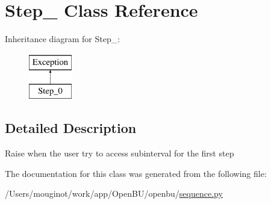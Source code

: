 \hypertarget{classopenbu_1_1sequence_1_1_step__0}{}\section{Step\+\_ Class Reference}
\label{classopenbu_1_1sequence_1_1_step__0}
Inheritance diagram for Step\+\_\+:\begin{figure}[H]
\begin{center}
\leavevmode
\includegraphics[height=2.000000cm]{classopenbu_1_1sequence_1_1_step__0}
\end{center}
\end{figure}


\subsection{Detailed Description}
\begin{DoxyVerb}Raise when the user try to access subinterval for the first step\end{DoxyVerb}
 

The documentation for this class was generated from the following file\+:\begin{DoxyCompactItemize}
\item 
/\+Users/mouginot/work/app/\+Open\+B\+U/openbu/\mbox{\hyperlink{sequence_8py}{sequence.\+py}}\end{DoxyCompactItemize}
